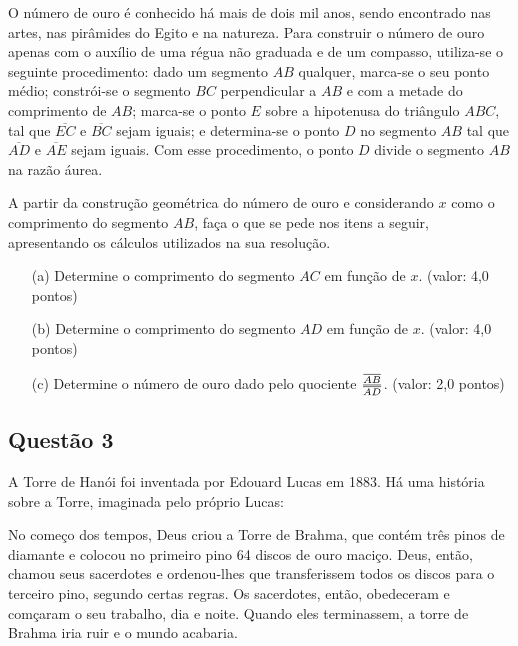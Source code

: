 O n\'umero de ouro \'e conhecido h\'a mais de dois mil anos, sendo encontrado nas artes, nas pir\^amides do Egito e na natureza. Para construir o n\'umero de ouro apenas com o aux\'ilio de uma r\'egua n\~ao graduada e de um compasso, utiliza-se o seguinte procedimento: dado um segmento $AB$ qualquer, marca-se o seu ponto m\'edio; constr\'oi-se o segmento $BC$ perpendicular a $AB$ e com a metade do comprimento de $AB$; marca-se o ponto $E$ sobre a hipotenusa do tri\^angulo $ABC$, tal que $\overline{EC}$ e $\overline{BC}$ sejam iguais; e determina-se o ponto $D$ no segmento $AB$ tal que $\overline{AD}$ e $\overline{AE}$ sejam iguais. Com esse procedimento, o ponto $D$ divide o segmento $AB$ na raz\~ao \'aurea.

A partir da constru\c c\~ao geom\'etrica do n\'umero de ouro e considerando $x$ como o comprimento do segmento $AB$, fa\c ca o que se pede nos itens a seguir, apresentando os c\'alculos utilizados na sua resolu\c c\~ao.

\begin{enumerate}

\item[(a)] Determine o comprimento do segmento $AC$ em fun\c c\~ao de $x$. (valor: 4,0 pontos)

\item[(b)] Determine o comprimento do segmento $AD$ em fun\c c\~ao de $x$. (valor: 4,0 pontos)

\item[(c)] Determine o n\'umero de ouro dado pelo quociente $\overline{AB}\over\overline{AD}$. (valor: 2,0 pontos)
\end{enumerate}

\subsection{\color{blue} Quest\~ao 3}

A Torre de Han\'oi foi inventada por Edouard Lucas em 1883. H\'a uma hist\'oria sobre a Torre, imaginada pelo pr\'oprio Lucas:

No come\c co dos tempos, Deus criou a Torre de Brahma, que cont\'em tr\^es pinos de diamante e colocou no primeiro pino 64 discos de ouro maci\c co. Deus, ent\~ao, chamou seus sacerdotes e ordenou-lhes que transferissem todos os discos para o terceiro pino, segundo certas regras. Os sacerdotes, ent\~ao, obedeceram e com\c caram o seu trabalho, dia e noite. Quando eles terminassem, a torre de Brahma iria ruir e o mundo acabaria.

